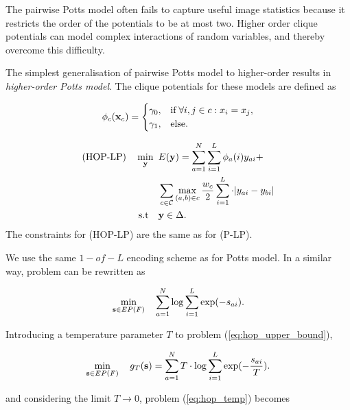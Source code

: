  The pairwise Potts model often fails
to capture useful image statistics because it restricts the order of the
potentials to be at most two. Higher order clique potentials can model complex
interactions of random variables, and thereby overcome this difficulty.

The simplest generalisation of pairwise Potts model to higher-order results in
\textit{higher-order Potts model}. The clique potentials for these models are
defined as

\begin{equation}
  \phi_c({\bf x}_c) = 
  \begin{cases}
    \gamma_0, &{\text{if}} \; \forall i, j \in c: x_i = x_j, \\
    \gamma_1, &{\text{else}}. 
  \end{cases} 
\end{equation}

\begin{align}
    \text{(HOP-LP)} \quad \min_{\bf y} \enskip & E({\bf y}) =  \sum_{a = 1}^N
    \sum_{i = 1}^L \phi_a(i)y_{ai} + \nonumber\\
    &\sum_{c \in {\mathcal C}} \max_{(a, b) \in c} \frac{w_c}{2} \sum_{i = 1}^L \cdot |y_{ai} - y_{bi}| \nonumber\\
    \text{s.t} \quad &{\bf y} \in \Delta.
\label{eq:hop-lp}
\end{align}
The constraints for (HOP-LP) are the same as for (P-LP).

 We use the same $1-of-L$ encoding
scheme as for Potts model. In a similar way, problem can be rewritten as

\begin{equation}
\min_{{\bf s} \in EP(F)} \quad \sum_{a = 1}^{N} \log \sum_{i = 1}^L \exp(-s_{ai}).
\label{eq:hop_upper_bound}
\end{equation}

Introducing a temperature parameter $T$ to problem (\ref{eq:hop_upper_bound}), 

\begin{equation}
    \min_{{\bf s} \in EP(F)} \quad g_T ({\bf s}) = \sum_{a = 1}^{N} T \cdot \log \sum_{i = 1}^L \exp(-\frac{s_{ai}}{T}).
\label{eq:hop_temp}
\end{equation}

and considering the limit $T \to 0$, problem (\ref{eq:hop_temp}) becomes

